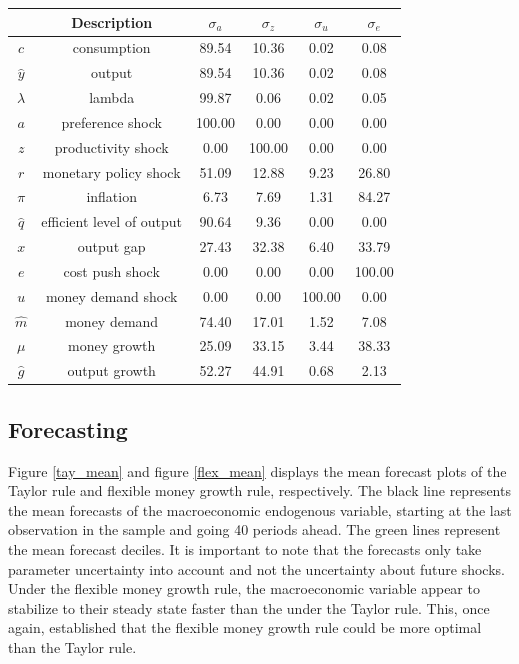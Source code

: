 \documentclass[11pt,preprint, authoryear]{elsarticle}
\let\origtable\table
\let\endorigtable\endtable
\renewenvironment{table}[1][2] {
    \expandafter\origtable\expandafter[H]
} {
    \endorigtable
}
\numberwithin{equation}{section}
\numberwithin{figure}{section}
\numberwithin{table}{section}
\begin{document}
\begin{table}
\caption{Flexible Monetary Policy Rule: Posterior Mean Variance Decomposition (in percent)}
 \begin{center}
\begin{tabular}{|c|c|c|c|c|c|}
\hline
  & Description &   ${\sigma_a}$  &  ${\sigma_z}$ & ${\sigma_u}$ & ${\sigma_e}$ \\ 
\hline
${c}$ & consumption & 89.54 & 10.36 & 0.02 & 0.08 \\
 ${\hat y}$  & output & 89.54 & 10.36 & 0.02 & 0.08 \\
 ${\lambda}$ & lambda & 99.87 & 0.06& 0.02 & 0.05 \\
${a}$ & preference shock & 100.00 & 0.00 & 0.00 & 0.00 \\
${z}$ & productivity shock & 0.00 & 100.00 & 0.00 & 0.00 \\
 ${r}$ & monetary policy shock & 51.09 & 12.88 & 9.23 & 26.80 \\
${\pi}$ & inflation & 6.73 & 7.69 & 1.31 & 84.27 \\
${\hat q}$ & efficient level of output & 90.64 & 9.36 & 0.00 & 0.00 \\
 ${x}$ & output gap & 27.43 & 32.38 & 6.40 & 33.79 \\
${e}$ & cost push shock & 0.00 & 0.00 & 0.00 & 100.00 \\
${u}$ & money demand shock & 0.00 & 0.00 & 100.00 & 0.00 \\
${\hat m}$ & money demand & 74.40 & 17.01 & 1.52 & 7.08 \\
${\mu}$  & money growth & 25.09 & 33.15 & 3.44 & 38.33 \\
${\hat g}$ & output growth & 52.27 & 44.91 & 0.68 & 2.13 \\
\hline
\end{tabular}
\end{center}
\label{flex_var_dec}
\end{table}

\hypertarget{forecasting}{%
\subsection{Forecasting}\label{forecasting}}

Figure \ref{tay_mean} and figure \ref{flex_mean} displays the mean
forecast plots of the Taylor rule and flexible money growth rule,
respectively. The black line represents the mean forecasts of the
macroeconomic endogenous variable, starting at the last observation in
the sample and going 40 periods ahead. The green lines represent the
mean forecast deciles. It is important to note that the forecasts only
take parameter uncertainty into account and not the uncertainty about
future shocks. Under the flexible money growth rule, the macroeconomic
variable appear to stabilize to their steady state faster than the under
the Taylor rule. This, once again, established that the flexible money
growth rule could be more optimal than the Taylor rule.
\end{document}
